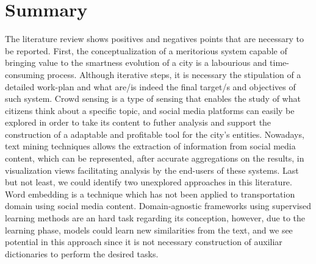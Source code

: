 \section{Summary}

The literature review shows positives and negatives points that are necessary to be reported. First, the conceptualization of a meritorious system capable of bringing value to the smartness evolution of a city is a labourious and time-consuming process. Although iterative steps, it is necessary the stipulation of a detailed work-plan and what are/is indeed the final target/s and objectives of such system. Crowd sensing is a type of sensing that enables the study of what citizens think about a specific topic, and social media platforms can easily be explored in order to take its content to futher analysis and support the construction of a adaptable and profitable tool for the city's entities. Nowadays, text mining techniques allows the extraction of information from social media content, which can be represented, after accurate aggregations on the results, in visualization views facilitating analysis by the end-users of these systems. Last but not least, we could identify two unexplored approaches in this literature. Word embedding is a technique which has not been applied to transportation domain using social media content. Domain-agnostic frameworks using supervised learning methods are an hard task regarding its conception, however, due to the learning phase, models could learn new similarities from the text, and we see potential in this approach since it is not necessary construction of auxiliar dictionaries to perform the desired tasks.